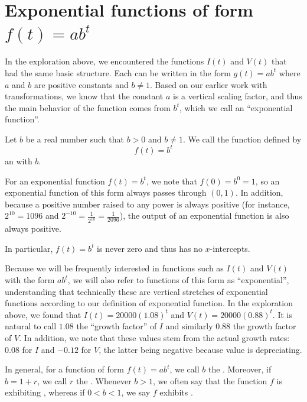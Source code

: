 \documentclass[nooutcomes]{ximera}
\begin{document}


\section{Exponential functions of form $f(t) = ab^t$}

In the exploration above, we encountered the functions $I(t)$ and $V(t)$ that had the same basic structure.  Each can be written in the form $g(t) = ab^t$ where $a$ and $b$ are positive constants and $b \ne 1$.  Based on our earlier work with transformations, we know that the constant $a$ is a vertical scaling factor, and thus the main behavior of the function comes from $b^t$, which we call an ``exponential function''.%
\begin{definition}
Let $b$ be a real number such that $b > 0$ and $b \ne 1$.  We call the function defined by%
$$f(t) = b^t$$
an  with  $b$.%
\end{definition}

For an exponential function $f(t) = b^t$, we note that $f(0) = b^0 = 1$, so an exponential function of this form always passes through $(0,1)$.  In addition, because a positive number raised to any power is always positive (for instance, $2^{10} = 1096$ and $2^{-10} = \frac{1}{2^{10}} = \frac{1}{2096}$), the output of an exponential function is also always positive.  

\begin{remark}
In particular, $f(t) = b^t$ is never zero and thus has no $x$-intercepts.
\end{remark}

Because we will be frequently interested in functions such as $I(t)$ and $V(t)$ with the form $ab^t$, we will also refer to functions of this form as ``exponential'', understanding that technically these are vertical stretches of exponential functions according to our definition of exponential function.  In the exploration above, we found that $I(t) = 20000(1.08)^t$ and $V(t) = 20000(0.88)^t$.  It is natural to call $1.08$ the ``growth factor''  of $I$ and similarly $0.88$ the growth factor of $V$.  In addition, we note that these values stem from the actual growth rates:  $0.08$ for $I$ and $-0.12$ for $V$, the latter being negative because value is depreciating.  

\begin{definition}
In general, for a function of form $f(t) = ab^t$, we call $b$ the .   Moreover, if $b = 1+r$, we call $r$ the .   Whenever $b > 1$, we often say that the function $f$ is exhibiting , whereas if $0 < b < 1$, we say $f$ exhibits . 
\end{definition}
\end{document}
